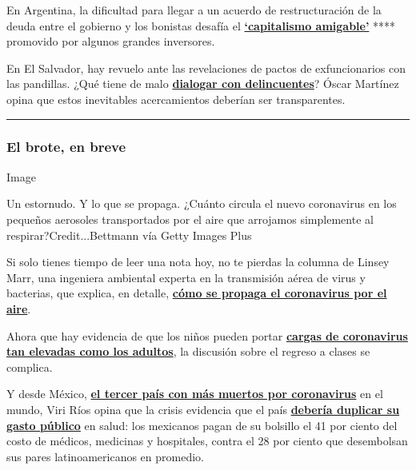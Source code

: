 En Argentina, la dificultad para llegar a un acuerdo de restructuración
de la deuda entre el gobierno y los bonistas desafía el
\textbf{\href{https://www.nytimes3xbfgragh.onion/es/2020/07/31/espanol/negocios/argentina-deuda.html}{`capitalismo
amigable'}} **** promovido por algunos grandes inversores.

En El Salvador, hay revuelo ante las revelaciones de pactos de
exfuncionarios con las pandillas. ¿Qué tiene de malo
\textbf{\href{https://www.nytimes3xbfgragh.onion/es/2020/08/02/espanol/opinion/pandillas-el-salvador.html}{dialogar
con delincuentes}}? Óscar Martínez opina que estos inevitables
acercamientos deberían ser transparentes.

\begin{center}\rule{0.5\linewidth}{\linethickness}\end{center}

\hypertarget{el-brote-en-breve}{%
\subsubsection{El brote, en breve}\label{el-brote-en-breve}}

Image

Un estornudo. Y lo que se propaga. ¿Cuánto circula el nuevo coronavirus
en los pequeños aerosoles transportados por el aire que arrojamos
simplemente al respirar?Credit...Bettmann vía Getty Images Plus

Si solo tienes tiempo de leer una nota hoy, no te pierdas la columna de
Linsey Marr, una ingeniera ambiental experta en la transmisión aérea de
virus y bacterias, que explica, en detalle,
\textbf{\href{https://www.nytimes3xbfgragh.onion/es/2020/08/01/espanol/opinion/coronavirus-aire.html}{cómo
se propaga el coronavirus por el aire}}.

Ahora que hay evidencia de que los niños pueden portar
\textbf{\href{https://www.nytimes3xbfgragh.onion/es/2020/07/31/espanol/ciencia-y-tecnologia/ninos-contagio-coronavirus.html}{cargas
de coronavirus tan elevadas como los adultos}}, la discusión sobre el
regreso a clases se complica.

Y desde México,
\textbf{\href{https://www.nytimes3xbfgragh.onion/es/interactive/2020/espanol/america-latina/coronavirus-en-mexico.html}{el
tercer país con más muertos por coronavirus}} en el mundo, Viri Ríos
opina que la crisis evidencia que el país
\textbf{\href{https://www.nytimes3xbfgragh.onion/es/2020/08/03/espanol/opinion/servicio-salud-mexico.html}{debería
duplicar su gasto público}} en salud: los mexicanos pagan de su bolsillo
el 41 por ciento del costo de médicos, medicinas y hospitales, contra el
28 por ciento que desembolsan sus pares latinoamericanos en promedio.

